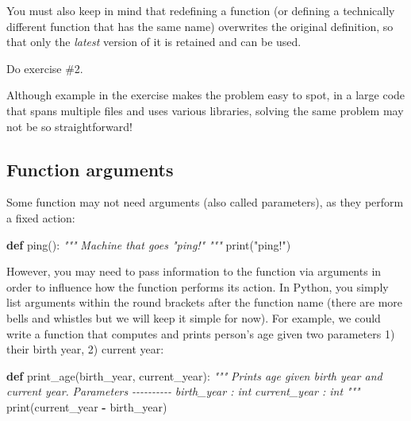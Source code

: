 \documentclass[
]{book}
\newenvironment{Shaded}{\begin{snugshade}}{\end{snugshade}}
\newcommand{\BuiltInTok}[1]{#1}
\newcommand{\CommentTok}[1]{\textcolor[rgb]{0.56,0.35,0.01}{\textit{#1}}}
\newcommand{\KeywordTok}[1]{\textcolor[rgb]{0.13,0.29,0.53}{\textbf{#1}}}
\newcommand{\NormalTok}[1]{#1}
\newcommand{\OperatorTok}[1]{\textcolor[rgb]{0.81,0.36,0.00}{\textbf{#1}}}
\newcommand{\StringTok}[1]{\textcolor[rgb]{0.31,0.60,0.02}{#1}}
\begin{document}
You must also keep in mind that redefining a function (or defining a technically different function that has the same name) overwrites the original definition, so that only the \emph{latest} version of it is retained and can be used.

Do exercise \#2.

Although example in the exercise makes the problem easy to spot, in a large code that spans multiple files and uses various libraries, solving the same problem may not be so straightforward!

\hypertarget{function-arguments}{%
\subsection{Function arguments}\label{function-arguments}}

Some function may not need arguments (also called parameters), as they perform a fixed action:

\begin{Shaded}
\begin{Highlighting}[]
\KeywordTok{def}\NormalTok{ ping():}
    \CommentTok{"""}
\CommentTok{    Machine that goes "ping!"}
\CommentTok{    """}
    \BuiltInTok{print}\NormalTok{(}\StringTok{"ping!"}\NormalTok{)}
\end{Highlighting}
\end{Shaded}

However, you may need to pass information to the function via arguments in order to influence how the function performs its action. In Python, you simply list arguments within the round brackets after the function name (there are more bells and whistles but we will keep it simple for now). For example, we could write a function that computes and prints person's age given two parameters 1) their birth year, 2) current year:

\begin{Shaded}
\begin{Highlighting}[]
\KeywordTok{def}\NormalTok{ print\_age(birth\_year, current\_year):}
    \CommentTok{"""}
\CommentTok{    Prints age given birth year and current year.}
\CommentTok{    }
\CommentTok{    Parameters}
\CommentTok{    {-}{-}{-}{-}{-}{-}{-}{-}{-}{-}}
\CommentTok{    birth\_year : int}
\CommentTok{    current\_year : int}
\CommentTok{    """}
    \BuiltInTok{print}\NormalTok{(current\_year }\OperatorTok{{-}}\NormalTok{ birth\_year)}
\end{Highlighting}
\end{Shaded}
\end{document}
